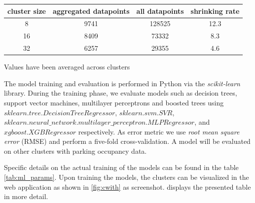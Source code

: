 	\begin{table}[!ht]
		{\begin{tabular}{ | c | c | c | c | } %
				\hline
				{cluster size} & {aggregated datapoints} & {all datapoints} & {shrinking rate} \\ \hline
				8 &	9741 & 128525 &	12.3 \\ \hline
				16 & 8409 &	73332 &	8.3 \\ \hline
				32 & 6257 &	29355 &	4.6 \\ \hline
		\end{tabular}}
		\begin{tabnote}
			Values have been averaged across clusters
		\end{tabnote}
		\label{tab:models_training_points}
	\end{table}
	
	The model training and evaluation is performed in Python via the \textit{scikit-learn} library. During the training phase, we evaluate models such as decision trees, support vector machines, multilayer perceptrons and boosted trees using $sklearn.tree.DecisionTreeRegressor$, $sklearn.svm.SVR$, $sklearn.neural\_network.multilayer\_perceptron.MLPRegressor$, and $xgboost.XGBRegressor$ respectively. As error metric we use \textit{root mean square error} (RMSE) and perform a five-fold cross-validation. A model will be evaluated on other clusters with parking occupancy data.
	
	Specific details on the actual training of the models can be found in the table \cref{tab:ml_params}. Upon training the models, the clusters can be visualized in the web application as shown in \cref{fig:cwith} as screenshot.  displays the presented table in more detail.
	
